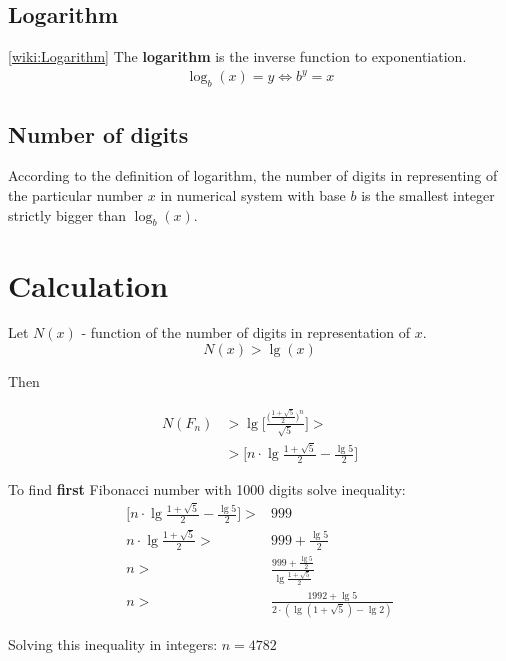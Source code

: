 \documentclass{article}
\begin{document}
\subsection{Logarithm}
[\href{https://en.wikipedia.org/wiki/Logarithm}{wiki:Logarithm}] \newline
The \textbf{logarithm} is the inverse function to exponentiation.
\begin{align*}
    \log_{b}{(x)} = y \iff b^{y} = x
\end{align*}

\subsection{Number of digits}
According to the definition of logarithm, the number of digits in representing of
the particular number $x$ in numerical system with base $b$ is the smallest integer
strictly bigger than $\log_{b}{(x)}$.

\section{Calculation}
Let $N(x)$ - function of the number of digits in representation of $x$.
\begin{equation*}
    N(x) > \lg{(x)}
\end{equation*}

Then

\begin{align*}
    N(F_n) & > \lg{\bigg[  \frac{\big( \frac{1 + \sqrt{5}}{2} \big)^{n}}{\sqrt{5}}  \bigg]}  > \\
    & >  \bigg[  n \cdot \lg{ \frac{1 + \sqrt{5}}{2} } - \frac{\lg{5}}{2}  \bigg]
\end{align*}

To find \textbf{first} Fibonacci number with 1000 digits solve inequality:
\begin{align*}
\bigg[  n \cdot \lg{ \frac{1 + \sqrt{5}}{2} } - \frac{\lg{5}}{2}  \bigg] > & 999 \\
n \cdot \lg{ \frac{1 + \sqrt{5}}{2} } > & 999 + \frac{\lg{5}}{2} \\
n > & \frac {999 + \frac{\lg{5}}{2}} {\lg{ \frac{1 + \sqrt{5}}{2} }} \\
n > & \frac {1992 + \lg{5}}{ 2 \cdot ( \lg{ (1 + \sqrt{5})} - \lg{2}) } 
\end{align*}

Solving this inequality in integers: $n = 4782$
\end{document}
